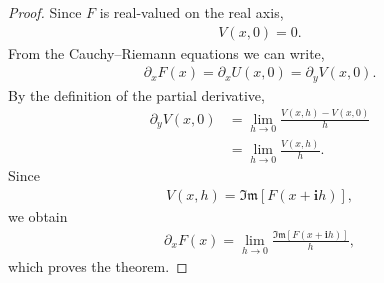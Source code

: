 \documentclass[10pt,a4paper]{amsart}
\newcommand{\ImagPart}{\mathfrak{Im}}
\newcommand{\imag}{\textbf{i}}
\begin{document}
	\begin{proof}
	Since \(F\) is real-valued on the real axis,
%
\begin{align*}
	V(x,0)=0.
\end{align*}
%
From the Cauchy--Riemann equations we can write,
%
\begin{align*}
	\partial_x F(x)
	=
	\partial_x U(x,0)
	=
	\partial_y V(x,0).
\end{align*}
%
By the definition of the partial derivative,
%
\begin{align*}
	\partial_y V(x,0)
	&=
	\lim_{h\rightarrow0}
	\frac{V(x,h)-V(x,0)}{h} \\
	&=
	\lim_{h\rightarrow0}
	\frac{V(x,h)}{h}.
\end{align*}
%
Since
%
\begin{align*}
	V(x,h)=\ImagPart\!\left[F(x+\imag h)\right],
\end{align*}
%
we obtain
%
\begin{align*}
	\partial_x F(x)
	=
	\lim_{h\rightarrow0}
	\frac{\ImagPart\!\left[F(x+\imag h)\right]}{h},
\end{align*}
%
which proves the theorem.
	\end{proof}
\end{document}
